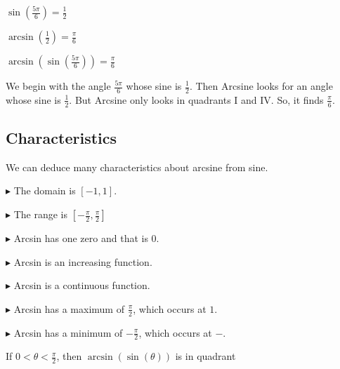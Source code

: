 \documentclass{ximera}
\begin{document}
\begin{example}



$\sin\left(\frac{5\pi}{6}\right) = \frac{1}{2}$

$\arcsin\left(\frac{1}{2}\right) = \frac{\pi}{6}$


$\arcsin\left(\sin\left(\frac{5\pi}{6}\right)\right) = \frac{\pi}{6}$




We begin with the angle $\frac{5\pi}{6}$ whose sine is $\frac{1}{2}$.  Then Arcsine looks for an angle whose sine is $\frac{1}{2}$.  But Arcsine only looks in quadrants I and IV.  So, it finds $\frac{\pi}{6}$.


\end{example}









\subsection{\textbf{\textcolor{purple!85!blue}{Characteristics}}} 

We can deduce many characteristics about arcsine from sine.


$\blacktriangleright$ The domain is  $[-1, 1]$.


$\blacktriangleright$ The range is $\left[ -\frac{\pi}{2}, \frac{\pi}{2} \right]$


$\blacktriangleright$ Arcsin has one zero and that is $0$.


$\blacktriangleright$ Arcsin is an increasing function.

$\blacktriangleright$ Arcsin is a continuous function.

$\blacktriangleright$ Arcsin has a maximum of $\frac{\pi}{2}$, which occurs at $1$.

$\blacktriangleright$ Arcsin has a minimum of $-\frac{\pi}{2}$, which occurs at $-$.



\begin{question}


If $0 < \theta < \frac{\pi}{2}$, then $\arcsin(\sin(\theta))$ is in quadrant

\begin{multipleChoice}
\end{multipleChoice}

\end{question}
\end{document}
